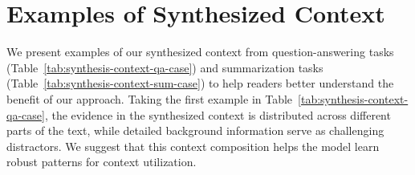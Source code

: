 \section{Examples of Synthesized Context}
\label{sec:example-synthesized-context}
We present examples of our synthesized context from question-answering tasks (Table~\ref{tab:synthesis-context-qa-case}) and summarization tasks (Table~\ref{tab:synthesis-context-sum-case}) to help readers better understand the benefit of our approach.
Taking the first example in Table~\ref{tab:synthesis-context-qa-case}, the evidence in the synthesized context is distributed across different parts of the text, while detailed background information serve as challenging distractors.
We suggest that this context composition helps the model learn robust patterns for context utilization.


